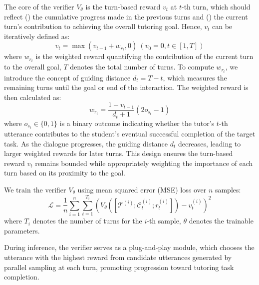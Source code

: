 The core of the verifier $V_{\theta}$ is the turn-based reward $v_t$ at $t$-th turn, which should reflect () the cumulative progress made in the previous turns and () the current turn's contribution to achieving the overall tutoring goal. Hence, $v_{t}$ can be iteratively defined as:
\begin{equation}
    v_t = \max(v_{t-1} + w_{r_t}, 0) ~(v_0=0, t\in[1,T])
\end{equation}
where $w_{r_t}$ is the weighted reward quantifying the contribution of the current turn to the overall goal, $T$ denotes the total number of turns. 
To compute $w_{r_t}$, we introduce the concept of guiding distance $d_t=T-t$, which measures the remaining turns until the goal or end of the interaction. The weighted reward is then calculated as:
\begin{equation}
\label{eq:weighted_reward}
    w_{r_t} = \frac{1-v_{t-1}}{d_{t}+1}(2o_{s_t}-1)
\end{equation}
where $o_{s_t}\in\{0,1\}$ is a binary outcome indicating whether the tutor's $t$-th utterance contributes to the student's eventual successful completion of the target task.
As the dialogue progresses, the guiding distance $d_t$ decreases, leading to larger weighted rewards for later turns. This design ensures the turn-based reward $v_t$ remains bounded while appropriately weighting the importance of each turn based on its proximity to the goal.



We train the verifier $V_{\theta}$ using mean squared error (MSE) loss over $n$ samples:
\begin{equation}
    \mathcal{L} = \frac{1}{n}\sum_{i=1}^{n}\sum_{t=1}^{T_i}\left(V_{\theta}([\mathcal{T}^{(i)};\mathcal{C}_{t}^{(i)};r_{t}^{(i)}]) - v_{t}^{(i)}\right)^2
\end{equation}
where $T_{i}$ denotes the number of turns for the $i$-th sample, $\theta$ denotes the trainable parameters.


During inference, the verifier serves as a plug-and-play module, which chooses the utterance with the highest reward from candidate utterances generated by parallel sampling at each turn, promoting progression toward tutoring task completion.
